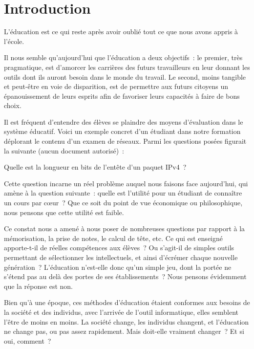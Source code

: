 
\chapter*{Introduction}\label{intro}

\begin{coolquote}
L'éducation est ce qui reste après avoir oublié tout ce que nous avons appris à l'école. 
\end{coolquote}

Il nous semble qu'aujourd'hui que l'éducation a deux objectifs~: le premier, très pragmatique, est d’amorcer les carrières des futurs travailleurs en leur donnant les outils dont ils auront besoin dans le monde du travail. Le second, moins tangible et peut-être en voie de disparition, est de permettre aux futurs citoyens un épanouissement de leurs esprits afin de favoriser leurs capacités à \og{}faire de bons choix\fg{}.

Il est fréquent d'entendre des élèves se plaindre des moyens d'évaluation dans le système éducatif. Voici un exemple concret d'un étudiant dans notre formation déplorant le contenu d'un examen de réseaux. Parmi les questions posées figurait la suivante (aucun document autorisé)~:

\begin{coolquote}Quelle est la
  longueur en bits de l'entête d'un paquet IPv4~?\end{coolquote}

Cette question incarne un réel problème auquel nous faisons face
aujourd'hui, qui amène à la question suivante~: quelle est l'utilité
pour un étudiant de connaître un cours par c\oe{}ur~? Que ce soit du
point de vue économique ou philosophique, nous pensons que cette
utilité est faible.

Ce constat nous a amené à nous poser de nombreuses questions par rapport à la mémorisation, la prise de notes, le calcul de tête, etc. Ce qui est enseigné apporte-t-il de réelles compétences aux élèves~? Ou s'agit-il de simples outils permettant de sélectionner les intellectuels, et ainsi d’écrémer chaque nouvelle génération~? L'éducation n'est-elle donc qu'un simple jeu, dont la portée ne s'étend pas au delà des portes de ses établissements~? Nous pensons évidemment que la réponse est non.

Bien qu'à une époque, ces méthodes d'éducation étaient conformes aux besoins de la société et des individus, avec l'arrivée de l'outil informatique, elles semblent l'être de moins en moins. La société change, les individus changent, et l'éducation ne change pas, ou pas assez rapidement. Mais doit-elle vraiment changer~? Et si oui, comment~?

